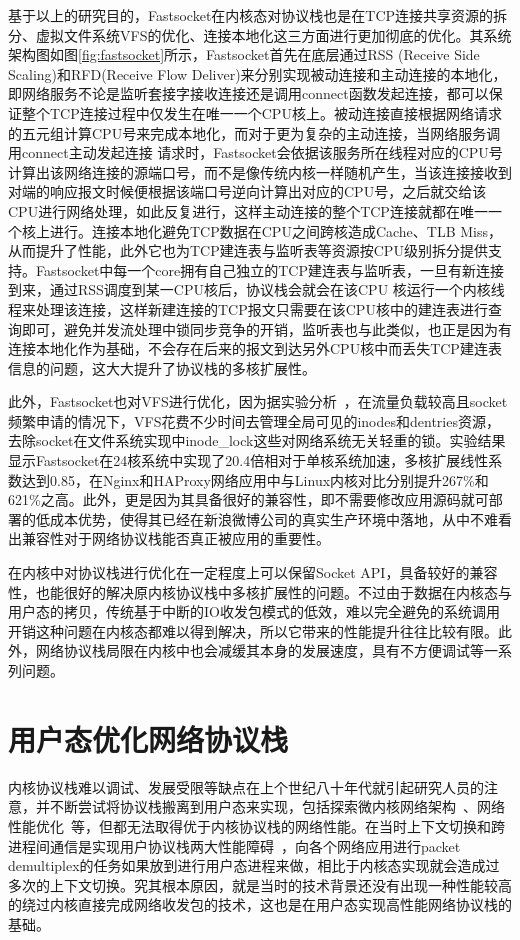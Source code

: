 基于以上的研究目的，Fastsocket在内核态对协议栈也是在TCP连接共享资源的拆分、虚拟文件系统VFS的优化、连接本地化这三方面进行更加彻底的优化。其系统架构图如图\ref{fig:fastsocket}所示，Fastsocket首先在底层通过RSS (Receive Side Scaling)和RFD(Receive Flow Deliver)来分别实现被动连接和主动连接的本地化，即网络服务不论是监听套接字接收连接还是调用connect函数发起连接，都可以保证整个TCP连接过程中仅发生在唯一一个CPU核上。被动连接直接根据网络请求的五元组计算CPU号来完成本地化，而对于更为复杂的主动连接，当网络服务调用connect主动发起连接 请求时，Fastsocket会依据该服务所在线程对应的CPU号计算出该网络连接的源端口号，而不是像传统内核一样随机产生，当该连接接收到对端的响应报文时候便根据该端口号逆向计算出对应的CPU号，之后就交给该CPU进行网络处理，如此反复进行，这样主动连接的整个TCP连接就都在唯一一个核上进行。连接本地化避免TCP数据在CPU之间跨核造成Cache、TLB Miss，从而提升了性能，此外它也为TCP建连表与监听表等资源按CPU级别拆分提供支持。Fastsocket中每一个core拥有自己独立的TCP建连表与监听表，一旦有新连接到来，通过RSS调度到某一CPU核后，协议栈会就会在该CPU 核运行一个内核线程来处理该连接，这样新建连接的TCP报文只需要在该CPU核中的建连表进行查询即可，避免并发流处理中锁同步竞争的开销，监听表也与此类似，也正是因为有连接本地化作为基础，不会存在后来的报文到达另外CPU核中而丢失TCP建连表信息的问题，这大大提升了协议栈的多核扩展性。



此外，Fastsocket也对VFS进行优化，因为据实验分析~\cite{boyd2010analysis}，在流量负载较高且socket频繁申请的情况下，VFS花费不少时间去管理全局可见的inodes和dentries资源，去除socket在文件系统实现中inode\_lock这些对网络系统无关轻重的锁。实验结果显示Fastsocket在24核系统中实现了20.4倍相对于单核系统加速，多核扩展线性系数达到0.85，在Nginx和HAProxy网络应用中与Linux内核对比分别提升267\%和621\%之高。此外，更是因为其具备很好的兼容性，即不需要修改应用源码就可部署的低成本优势，使得其已经在新浪微博公司的真实生产环境中落地，从中不难看出兼容性对于网络协议栈能否真正被应用的重要性。

在内核中对协议栈进行优化在一定程度上可以保留Socket API，具备较好的兼容性，也能很好的解决原内核协议栈中多核扩展性的问题。不过由于数据在内核态与用户态的拷贝，传统基于中断的IO收发包模式的低效，难以完全避免的系统调用开销这种问题在内核态都难以得到解决，所以它带来的性能提升往往比较有限。此外，网络协议栈局限在内核中也会减缓其本身的发展速度，具有不方便调试等一系列问题。

\section{用户态优化网络协议栈}
\label{sec:userspace}
内核协议栈难以调试、发展受限等缺点在上个世纪八十年代就引起研究人员的注意，并不断尝试将协议栈搬离到用户态来实现，包括探索微内核网络架构~\cite{maeda1994protocol}、网络性能优化~\cite{thekkath1993implementing,basu1995user,edwards1995experiences}等，但都无法取得优于内核协议栈的网络性能。在当时上下文切换和跨进程间通信是实现用户协议栈两大性能障碍~\cite{1987packer}，向各个网络应用进行packet demultiplex的任务如果放到进行用户态进程来做，相比于内核态实现就会造成过多次的上下文切换。究其根本原因，就是当时的技术背景还没有出现一种性能较高的绕过内核直接完成网络收发包的技术，这也是在用户态实现高性能网络协议栈的基础。


